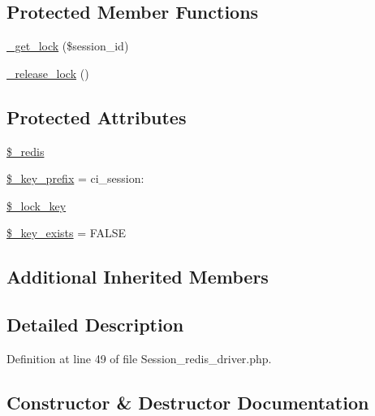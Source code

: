 \subsection*{Protected Member Functions}
\begin{DoxyCompactItemize}
\item 
\mbox{\hyperlink{class_c_i___session__redis__driver_a2c49c8e23be3e2aca96a9d20de18ffc2}{\+\_\+get\+\_\+lock}} (\$session\+\_\+id)
\item 
\mbox{\hyperlink{class_c_i___session__redis__driver_a0265e356e6cf1eaba229663c1664c37d}{\+\_\+release\+\_\+lock}} ()
\end{DoxyCompactItemize}
\subsection*{Protected Attributes}
\begin{DoxyCompactItemize}
\item 
\mbox{\hyperlink{class_c_i___session__redis__driver_a36de60a8fcbe3efac91a87577d0728de}{\$\+\_\+redis}}
\item 
\mbox{\hyperlink{class_c_i___session__redis__driver_a177f231cc2eec31d9aa8f50f9ec9b407}{\$\+\_\+key\+\_\+prefix}} = \textquotesingle{}ci\+\_\+session\+:\textquotesingle{}
\item 
\mbox{\hyperlink{class_c_i___session__redis__driver_a79bf61cb0768c7bb23404280ae004fb4}{\$\+\_\+lock\+\_\+key}}
\item 
\mbox{\hyperlink{class_c_i___session__redis__driver_ac440c17ec7ee39042a2f7665870957d3}{\$\+\_\+key\+\_\+exists}} = F\+A\+L\+SE
\end{DoxyCompactItemize}
\subsection*{Additional Inherited Members}


\subsection{Detailed Description}


Definition at line 49 of file Session\+\_\+redis\+\_\+driver.\+php.



\subsection{Constructor \& Destructor Documentation}
\mbox{\label{class_c_i___session__redis__driver_ac1669c73d53d6f16cf5459a1e84d39c8}} 
